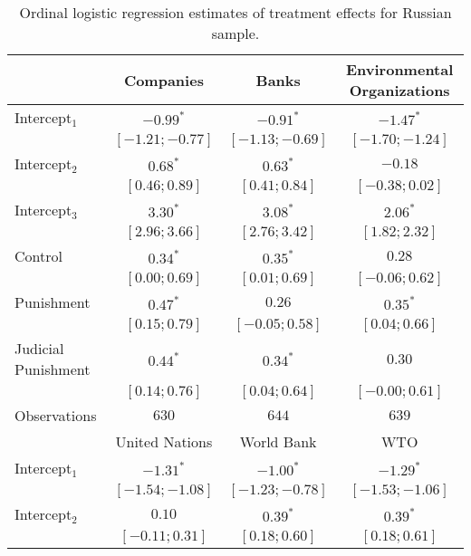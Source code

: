 \begin{table}[h]
\begin{center}
\caption{Ordinal logistic regression estimates of treatment effects for Russian sample.}
\begin{threeparttable}
\begin{tabular}{l c c c}
\hline
 & Companies & Banks & Environmental
Organizations \\
\hline
Intercept$_1$       & $-0.99^{*}$       & $-0.91^{*}$       & $-1.47^{*}$       \\
                    & $ [-1.21; -0.77]$ & $ [-1.13; -0.69]$ & $ [-1.70; -1.24]$ \\
Intercept$_2$       & $0.68^{*}$        & $0.63^{*}$        & $-0.18$           \\
                    & $ [ 0.46;  0.89]$ & $ [ 0.41;  0.84]$ & $ [-0.38;  0.02]$ \\
Intercept$_3$       & $3.30^{*}$        & $3.08^{*}$        & $2.06^{*}$        \\
                    & $ [ 2.96;  3.66]$ & $ [ 2.76;  3.42]$ & $ [ 1.82;  2.32]$ \\
Control             & $0.34^{*}$        & $0.35^{*}$        & $0.28$            \\
                    & $ [ 0.00;  0.69]$ & $ [ 0.01;  0.69]$ & $ [-0.06;  0.62]$ \\
Punishment          & $0.47^{*}$        & $0.26$            & $0.35^{*}$        \\
                    & $ [ 0.15;  0.79]$ & $ [-0.05;  0.58]$ & $ [ 0.04;  0.66]$ \\
Judicial Punishment & $0.44^{*}$        & $0.34^{*}$        & $0.30$            \\
                    & $ [ 0.14;  0.76]$ & $ [ 0.04;  0.64]$ & $ [-0.00;  0.61]$ \\
\hline
Observations        & $630$             & $644$             & $639$             \\
\hline
 & United Nations & World Bank & WTO \\
\hline
Intercept$_1$       & $-1.31^{*}$       & $-1.00^{*}$       & $-1.29^{*}$       \\
                    & $ [-1.54; -1.08]$ & $ [-1.23; -0.78]$ & $ [-1.53; -1.06]$ \\
Intercept$_2$       & $0.10$            & $0.39^{*}$        & $0.39^{*}$        \\
                    & $ [-0.11;  0.31]$ & $ [ 0.18;  0.60]$ & $ [ 0.18;  0.61]$ \\

\end{tabular}
\end{threeparttable}
\end{center}
\end{table}
